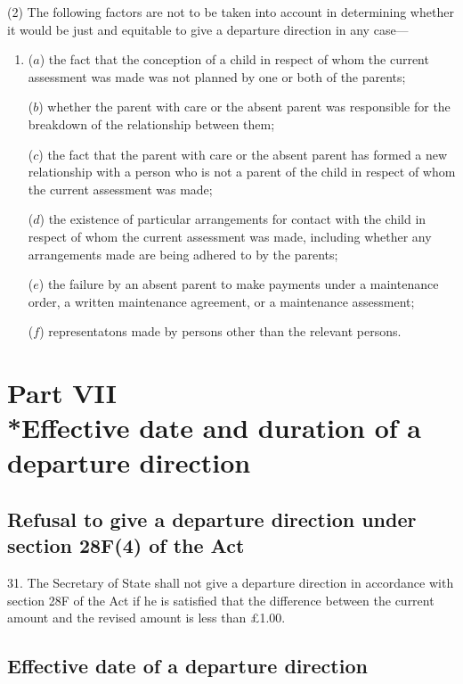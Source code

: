 \documentclass[a4paper]{article}
\newcommand{\parthead}{}
\begin{document}
(2) The following factors are not to be taken into account in determining whether it would be just and equitable to give a departure direction in any case—
\begin{enumerate}\item[]
($a$) the fact that the conception of a child in respect of whom the current assessment was made was not planned by one or both of the parents;

($b$) whether the parent with care or the absent parent was responsible for the breakdown of the relationship between them;

($c$) the fact that the parent with care or the absent parent has formed a new relationship with a person who is not a parent of the child in respect of whom the current assessment was made;

($d$) the existence of particular arrangements for contact with the child in respect of whom the current assessment was made, including whether any arrangements made are being adhered to by the parents;

($e$) the failure by an absent parent to make payments under a maintenance order, a written maintenance agreement, or a maintenance assessment;

($f$) representatons made by persons other than the relevant persons.
\end{enumerate}

\section[Part VII --- Effective date and duration of a departure direction]{Part VII\\*Effective date and duration of a departure direction}

\renewcommand\parthead{--- Part VII}

\subsection[31. Refusal to give a departure direction under section 28F(4) of the Act]{Refusal to give a departure direction under section 28F(4) of the Act}

31.  The Secretary of State shall not give a departure direction in accordance with section 28F of the Act if he is satisfied that the difference between the current amount and the revised amount is less than £1.00.

\subsection[32. Effective date of a departure direction]{Effective date of a departure direction}
\end{document}
